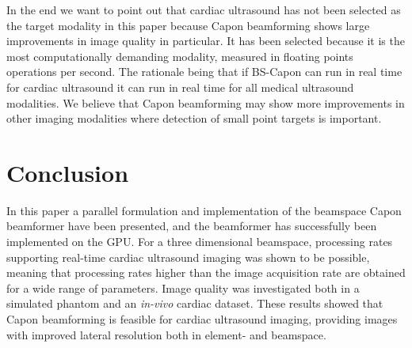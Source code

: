 \documentclass[journal]{IEEEtran}
\begin{document}
In the end we want to point out that cardiac ultrasound has not been selected as the target modality in this paper because Capon beamforming shows large improvements in image quality in particular. It has been selected because it is the most computationally demanding modality, measured in floating points operations per second. The rationale being that if BS-Capon can run in real time for cardiac ultrasound it can run in real time for all medical ultrasound modalities. We believe that Capon beamforming may show more improvements in other imaging modalities where detection of small point targets is important.




\section{Conclusion}\label{sec:con}
In this paper a parallel formulation and implementation of the beamspace Capon beamformer have been presented, and
the beamformer has successfully been implemented on the GPU. For a three dimensional beamspace, processing rates supporting real-time cardiac ultrasound imaging was shown to be possible, meaning that processing rates higher than the image acquisition rate are obtained for a wide range of parameters. Image quality was investigated both in a simulated phantom and an \textit{in-vivo} cardiac dataset. These results showed that Capon beamforming is feasible for cardiac ultrasound imaging, providing images with improved lateral resolution both in element- and beamspace.
\end{document}
